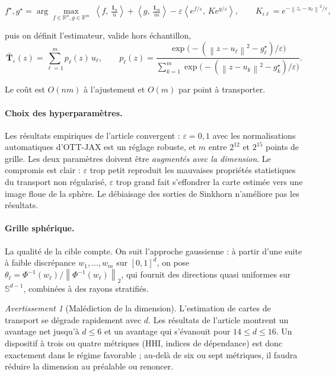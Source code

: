 \documentclass[11pt,a4paper]{article}
\theoremstyle{definition}
\theoremstyle{remark}
\newtheorem{avertissement}{Avertissement}[section]
\newcommand{\R}{\mathbb{R}}
\newcommand{\Sphere}{\mathbb{S}}
\newcommand{\norm}[1]{\left\lVert #1 \right\rVert}
\newcommand{\scal}[2]{\left\langle #1 ,\, #2 \right\rangle}
\newcommand{\Tmap}{\mathbf{T}}
\begin{document}
\medskip

\[
f^\star, g^\star = \arg\max_{f \in \R^n, g \in \R^m}\;
\scal{f}{\tfrac{\mathbf{1}_n}{n}} + \scal{g}{\tfrac{\mathbf{1}_m}{m}}
- \varepsilon \scal{e^{f/\varepsilon}}{K e^{g/\varepsilon}},
\qquad K_{i\ell} = e^{-\norm{z_i - u_\ell}^2/\varepsilon},
\]

\bigskip

puis on définit l'estimateur, valide hors échantillon,
\[
\bar{\Tmap}_\varepsilon(z) = \sum_{\ell=1}^{m} p_\ell(z)\, u_\ell,
\qquad
p_\ell(z) = \frac{\exp\!\big(-(\norm{z - u_\ell}^2 - g^\star_\ell)/\varepsilon\big)}
{\sum_{k=1}^{m}\exp\!\big(-(\norm{z - u_k}^2 - g^\star_k)/\varepsilon\big)}.
\]

\bigskip

Le coût est $O(nm)$ à l'ajustement et $O(m)$ par point à transporter.

\paragraph{Choix des hyperparamètres.} Les résultats empiriques de l'article convergent :
$\varepsilon = 0{,}1$ avec les normalisations automatiques d'OTT-JAX est un réglage robuste, et
$m$ entre $2^{12}$ et $2^{15}$ points de grille. Les deux paramètres doivent être \emph{augmentés
avec la dimension}. Le compromis est clair : $\varepsilon$ trop petit reproduit les mauvaises
propriétés statistiques du transport non régularisé, $\varepsilon$ trop grand fait s'effondrer la
carte estimée vers une image floue de la sphère. Le débiaisage des sorties de Sinkhorn n'améliore
pas les résultats.

\bigskip

\paragraph{Grille sphérique.} La qualité de la cible compte. On suit l'approche gaussienne : à
partir d'une suite à faible discrépance $w_1,\dots,w_m$ sur $[0,1]^d$, on pose
$\theta_\ell = \Phi^{-1}(w_\ell)/\norm{\Phi^{-1}(w_\ell)}_2$, qui fournit des directions quasi
uniformes sur $\Sphere^{d-1}$, combinées à des rayons stratifiés.

\bigskip

\begin{avertissement}[Malédiction de la dimension]
  L'estimation de cartes de transport se dégrade rapidement avec $d$. Les résultats de l'article
  montrent un avantage net jusqu'à $d \le 6$ et un avantage qui s'évanouit pour $14 \le d \le 16$.
  Un dispositif à trois ou quatre métriques (HHI, indices de dépendance) est donc exactement dans
  le régime favorable ; au-delà de six ou sept métriques, il faudra réduire la dimension au
  préalable ou renoncer.
\end{avertissement}
\end{document}
